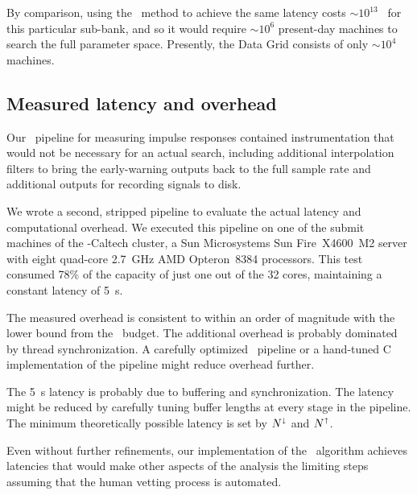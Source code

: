By comparison, using the \TD\ method to achieve the same latency costs
$\sim$$10^{13}$ \flops\ for this particular sub-bank, and so it would require
$\sim$$10^6$ present-day machines to search the full parameter space.
Presently, the \LIGO{} Data Grid consists of only $\sim$$10^4$ machines.

\subsection{Measured latency and overhead}

Our \gstreamer\ pipeline for measuring impulse responses contained
instrumentation that would not be necessary for an actual search, including
additional interpolation filters to bring the early-warning outputs back to the
full sample rate and additional outputs for recording signals to disk.

We wrote a second, stripped pipeline to evaluate the actual latency and
computational overhead.  We executed this pipeline on one of the submit
machines of the \LIGO-Caltech cluster, a Sun Microsystems Sun
Fire\texttrademark\ X4600~M2 server with eight quad-core 2.7~GHz AMD
Opteron\texttrademark\ 8384 processors.  This test consumed 78\% of the
capacity of just one out of the 32 cores, maintaining a constant latency of
5~s.

The measured overhead is consistent to within an order of magnitude with the
lower bound from the \flops\ budget.  The additional overhead is probably
dominated by thread synchronization.  A carefully optimized \gstreamer\
pipeline or a hand-tuned C implementation of the pipeline might reduce overhead
further.

The 5~s latency is probably due to buffering and synchronization.  The latency
might be reduced by carefully tuning buffer lengths at every stage in
the pipeline.  The minimum theoretically possible latency is set by
$N^\shortdownarrow$ and $N^\shortuparrow$.

Even without further refinements, our implementation of the \lloid\ algorithm
achieves latencies that would make other aspects of the analysis the limiting
steps assuming that the human vetting process is automated.  
